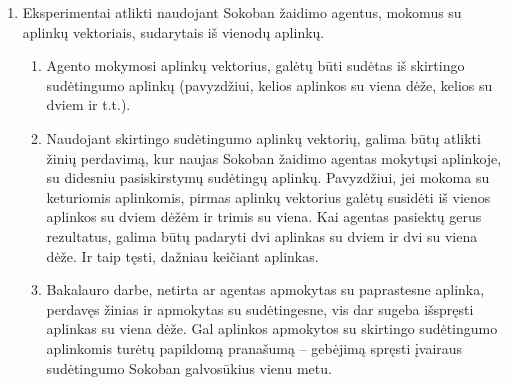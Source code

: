 \documentclass{VUMIFPSbakalaurinis}
\begin{document}
{\begin{enumerate}
\begin{enumerate}
			\item Naudoti pritaikytus Sokoban aplinkai algoritmų parametrus, ne algoritmų numatytuosius.
		\end{enumerate}
		\item Eksperimentai atlikti naudojant Sokoban žaidimo agentus, mokomus su aplinkų vektoriais, sudarytais iš vienodų aplinkų.
		\begin{enumerate}
			\item Agento mokymosi aplinkų vektorius, galėtų būti sudėtas iš skirtingo sudėtingumo aplinkų (pavyzdžiui, kelios aplinkos su viena dėže, kelios su dviem ir t.t.).
			\item Naudojant skirtingo sudėtingumo aplinkų vektorių, galima būtų atlikti žinių perdavimą, kur naujas Sokoban žaidimo agentas mokytųsi aplinkoje, su didesniu pasiskirstymų sudėtingų aplinkų. Pavyzdžiui, jei mokoma su keturiomis aplinkomis, pirmas aplinkų vektorius galėtų susidėti iš vienos aplinkos su dviem dėžėm ir trimis su viena. Kai agentas pasiektų gerus rezultatus, galima būtų padaryti dvi aplinkas su dviem ir dvi su viena dėže. Ir taip tęsti, dažniau keičiant aplinkas.
			\item Bakalauro darbe, netirta ar agentas apmokytas su paprastesne aplinka, perdavęs žinias ir apmokytas su sudėtingesne, vis dar sugeba išspręsti aplinkas su viena dėže. Gal aplinkos apmokytos su skirtingo sudėtingumo aplinkomis turėtų papildomą pranašumą -- gebėjimą spręsti įvairaus sudėtingumo Sokoban galvosūkius vienu metu.
		\end{enumerate}
	\end{enumerate}
}
\printbibliography[heading=bibintoc] 
\end{document}
